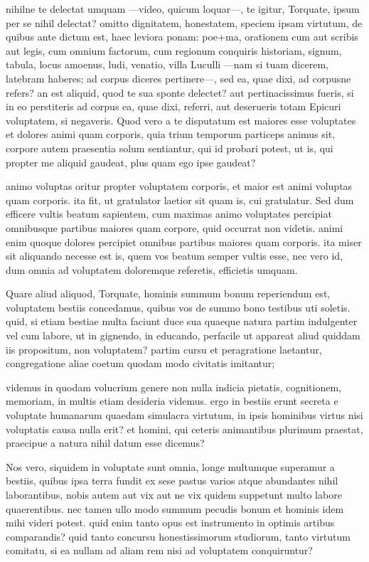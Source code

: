  nihilne te delectat umquam —video, quicum loquar—, te igitur, Torquate, ipsum per se nihil delectat? omitto dignitatem, honestatem, speciem ipsam virtutum, de quibus ante dictum est, haec leviora ponam: poe+ma, orationem cum aut scribis aut legis, cum omnium factorum, cum regionum conquiris historiam, signum, tabula, locus amoenus, ludi, venatio, villa Luculli —nam si tuam dicerem, latebram haberes; ad corpus diceres pertinere—, sed ea, quae dixi, ad corpusne refers? an est aliquid, quod te sua sponte delectet? aut pertinacissimus fueris, si in eo perstiteris ad corpus ea, quae dixi, referri, aut deserueris totam Epicuri voluptatem, si negaveris. Quod vero a te disputatum est maiores esse voluptates et dolores animi quam corporis, quia trium temporum particeps animus sit, corpore autem praesentia solum sentiantur, qui id probari potest, ut is, qui propter me aliquid gaudeat, plus quam ego ipse gaudeat?

 animo voluptas oritur propter voluptatem corporis, et maior est animi voluptas quam corporis. ita fit, ut gratulator laetior sit quam is, cui gratulatur. Sed dum efficere vultis beatum sapientem, cum maximas animo voluptates percipiat omnibusque partibus maiores quam corpore, quid occurrat non videtis. animi enim quoque dolores percipiet omnibus partibus maiores quam corporis. ita miser sit aliquando necesse est is, quem vos beatum semper vultis esse, nec vero id, dum omnia ad voluptatem doloremque referetis, efficietis umquam.

 Quare aliud aliquod, Torquate, hominis summum bonum reperiendum est, voluptatem bestiis concedamus, quibus vos de summo bono testibus uti soletis. quid, si etiam bestiae multa faciunt duce sua quaeque natura partim indulgenter vel cum labore, ut in gignendo, in educando, perfacile ut appareat aliud quiddam iis propositum, non voluptatem? partim cursu et peragratione laetantur, congregatione aliae coetum quodam modo civitatis imitantur;

 videmus in quodam volucrium genere non nulla indicia pietatis, cognitionem, memoriam, in multis etiam desideria videmus. ergo in bestiis erunt secreta e voluptate humanarum quaedam simulacra virtutum, in ipsis hominibus virtus nisi voluptatis causa nulla erit? et homini, qui ceteris animantibus plurimum praestat, praecipue a natura nihil datum esse dicemus?

 Nos vero, siquidem in voluptate sunt omnia, longe multumque superamur a bestiis, quibus ipsa terra fundit ex sese pastus varios atque abundantes nihil laborantibus, nobis autem aut vix aut ne vix quidem suppetunt multo labore quaerentibus. nec tamen ullo modo summum pecudis bonum et hominis idem mihi videri potest. quid enim tanto opus est instrumento in optimis artibus comparandis? quid tanto concursu honestissimorum studiorum, tanto virtutum comitatu, si ea nullam ad aliam rem nisi ad voluptatem conquiruntur?

